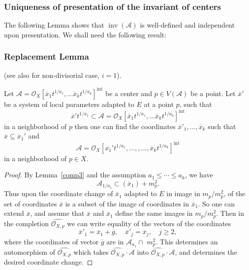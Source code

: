 \documentclass{amsart}
\newcommand{\QQ}{{\mathbb{Q}}}
\newcommand{\cA}{{\mathcal A}}
\newcommand{\cJ}{{\mathcal J}}
\newcommand{\cO}{{\mathcal O}}
\newcommand{\inv}{{\operatorname{inv}}}
\newcommand{\inte}{{\operatorname{int}}}
\begin{document}
\subsubsection{Uniqueness of presentation of the invariant of  centers}
The following Lemma shows that $\inv(\cA)$ is well-defined and  independent upon presentation.
We shall need the following result:
\subsubsection{Replacement Lemma}
\begin{lemma} \label{val} (see also \cite{ATW-weighted} for non-divisorial case, $i=1$).


Let $\cA=\cO_X[\overline{x}_1 t^{1/a_1},\ldots\overline{x}_kt^{1/a_k}]^{\inte}$ be a center and $p\in V(\cA)$ be a point.
Let $\overline{x}'$ be a system of local parameters  adapted  to $E$ at a point $p$, such that $$\overline{x}' t^{1/a_1} \subset \cA=\cO_X[\overline{x}_1 t^{1/a_1},\ldots\overline{x}_kt^{1/a_k}]^\inte$$  in a neighborhood  of $p$ then 
one can find  the coordinates $\overline{x}'_1,\ldots, \overline{x}_k$ such that  $\overline{x}\subseteq \overline{x}_1'$ and   $$\cA=\cO_X[\overline{x_1}' t^{1/a_1},\ldots,,\ldots, \overline{x}_kt^{1/a_k}]^\inte$$ in a neighborhood of $p\in X$.
	\end{lemma}
	\begin{proof}%
By Lemma~\ref{comp3} and the assumption \( a_1 \leq \cdots \leq a_k \), we have
\[
\mathcal{A}_{1/a_1} \subset (\overline{x}_1) + m_p^2.
\]Thus upon the coordinate change of $\overline{x}_1$ adapted  to $E$ in image in $m_p/m_p^2$, of the set of coordinates $\overline{x}$ is a subset of the image of coordinates  in $\overline{x}_1$. So one can extend $\overline{x}$, and assume that $\overline{x}$ and $\overline{x}_1$ define  the same images in  $m_p/m_p^2$.
Then  in the completion $\widehat{\cO_{X,p}}$ we can write
equality of the vectors of the coordinates
$$\overline{x}'_1=\overline{x}_1+\overline{g},\quad  \overline{x}'_j=\overline{x}_j,\quad j\geq 2, $$ 
where the coordinates of vector $\overline{g}$ are in $\cA_{a_1}\cap \,\,m_p^2$.
This determines an automorphism of $\widehat{\cO_{X,p}}$  which takes $\widehat{\cO_{X,p}}\cdot\cA$ into $\widehat{\cO_{X,p}}\cdot \cA$, and determines the desired coordinate change.
\end{proof}
\end{document}
